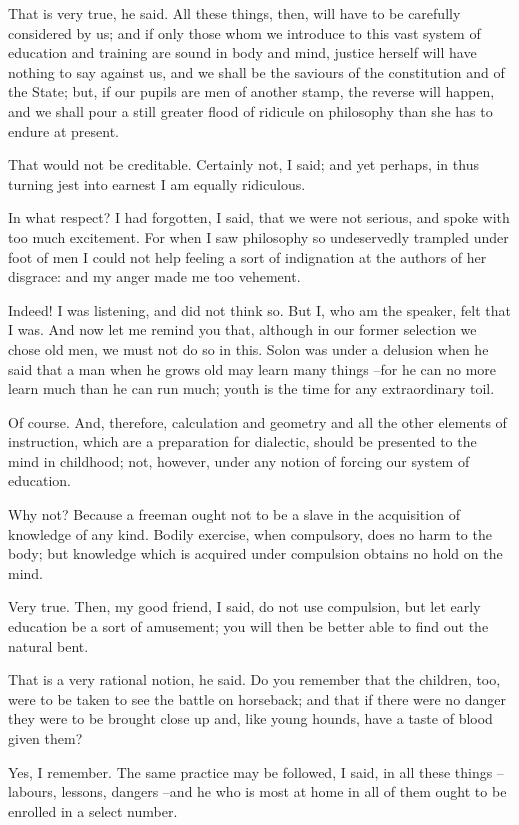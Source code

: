 That is very true, he said.
All these things, then, will have to be carefully considered by us; and if only those whom we introduce to this vast system of education and training are sound in body and mind, justice herself will have nothing to say against us, and we shall be the saviours of the constitution and of the State; but, if our pupils are men of another stamp, the reverse will happen, and we shall pour a still greater flood of ridicule on philosophy than she has to endure at present.

That would not be creditable.
Certainly not, I said; and yet perhaps, in thus turning jest into earnest I am equally ridiculous.

In what respect?
I had forgotten, I said, that we were not serious, and spoke with too much excitement. For when I saw philosophy so undeservedly trampled under foot of men I could not help feeling a sort of indignation at the authors of her disgrace: and my anger made me too vehement.

Indeed! I was listening, and did not think so.
But I, who am the speaker, felt that I was. And now let me remind you that, although in our former selection we chose old men, we must not do so in this. Solon was under a delusion when he said that a man when he grows old may learn many things --for he can no more learn much than he can run much; youth is the time for any extraordinary toil.

Of course.
And, therefore, calculation and geometry and all the other elements of instruction, which are a preparation for dialectic, should be presented to the mind in childhood; not, however, under any notion of forcing our system of education.

Why not?
Because a freeman ought not to be a slave in the acquisition of knowledge of any kind. Bodily exercise, when compulsory, does no harm to the body; but knowledge which is acquired under compulsion obtains no hold on the mind.

Very true.
Then, my good friend, I said, do not use compulsion, but let early education be a sort of amusement; you will then be better able to find out the natural bent.

That is a very rational notion, he said.
Do you remember that the children, too, were to be taken to see the battle on horseback; and that if there were no danger they were to be brought close up and, like young hounds, have a taste of blood given them?

Yes, I remember.
The same practice may be followed, I said, in all these things --labours, lessons, dangers --and he who is most at home in all of them ought to be enrolled in a select number.

